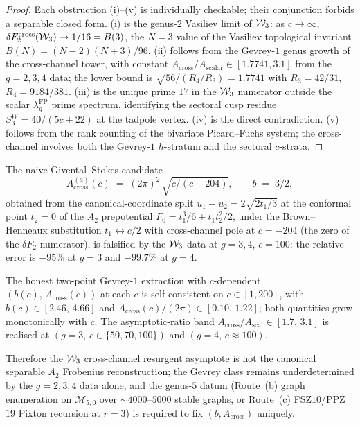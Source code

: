 \begin{proof}
Each obstruction (i)--(v) is individually checkable; their
conjunction forbids a separable closed form. (i) is the
genus-$2$ Vasiliev limit of $\mathcal{W}_3$: as $c \to \infty$,
$\delta F_2^{\mathrm{cross}}(\mathcal{W}_3) \to 1/16 = B(3)$, the
$N = 3$ value of the Vasiliev topological invariant
$B(N) = (N - 2)(N + 3) / 96$. (ii) follows from the Gevrey-$1$
genus growth of the cross-channel tower, with constant
$A_{\mathrm{cross}} / A_{\mathrm{scalar}} \in [1.7741, 3.1]$ from the
$g = 2, 3, 4$ data; the lower bound is
$\sqrt{56/(R_4/R_3)} = 1.7741$ with $R_3 = 42/31$,
$R_4 = 9184/381$. (iii) is the unique prime $17$ in the
$\mathcal{W}_3$ numerator outside the scalar $\lambda_g^{\mathrm{FP}}$
prime spectrum, identifying the sectoral cusp residue
$S_3^W = 40/(5c + 22)$ at the tadpole vertex. (iv) is the
direct contradiction. (v) follows from the rank counting of
the bivariate Picard--Fuchs system; the cross-channel involves
both the Gevrey-$1$ $\hbar$-stratum and the sectoral $c$-strata.
\end{proof}

\begin{proposition}
\label{prop:f3-givental-stokes-falsification}
The naive Givental--Stokes candidate
\[
 A_{\mathrm{cross}}^{(a)}(c)
 \;=\;
 (2 \pi)^2\, \sqrt{c/(c + 204)},
\qquad
 b \;=\; 3/2,
\]
obtained from the canonical-coordinate split
$u_1 - u_2 = 2 \sqrt{2 t_1 / 3}$ at the conformal point $t_2 = 0$
of the $A_2$ prepotential
$F_0 = t_1^3 / 6 + t_1 t_2^2 / 2$, under the Brown--Henneaux
substitution $t_1 \leftrightarrow c/2$ with cross-channel pole at
$c = -204$ (the zero of the $\delta F_2$ numerator), is falsified
by the $\mathcal{W}_3$ data at $g = 3, 4$, $c = 100$: the relative error
is $-95\%$ at $g = 3$ and $-99.7\%$ at $g = 4$.

The honest two-point Gevrey-$1$ extraction with $c$-dependent
$(b(c),\, A_{\mathrm{cross}}(c))$ at each $c$ is self-consistent on
$c \in [1, 200]$, with
$b(c) \in [2.46,\, 4.66]$ and
$A_{\mathrm{cross}}(c) / (2 \pi) \in [0.10,\, 1.22]$; both quantities
grow monotonically with $c$. The asymptotic-ratio band
$A_{\mathrm{cross}} / A_{\mathrm{scal}} \in [1.7,\, 3.1]$ is realised
at $(g = 3,\, c \in \{50, 70, 100\})$ and $(g = 4,\, c \approx 100)$.

Therefore the $\mathcal{W}_3$ cross-channel resurgent asymptote is not the
canonical separable $A_2$ Frobenius reconstruction; the Gevrey class
remains underdetermined by the $g = 2, 3, 4$ data alone, and the
genus-$5$ datum (Route~(b) graph enumeration on
$\overline{\mathcal M}_{5, 0}$ over $\sim 4000$--$5000$ stable graphs,
or Route~(c) FSZ$10$/PPZ$19$ Pixton recursion at $r = 3$) is required
to fix $(b, A_{\mathrm{cross}})$ uniquely.
\end{proposition}

